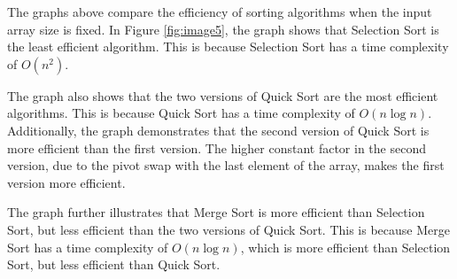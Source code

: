 \documentclass[12pt, letterpaper]{report}
\begin{document}
\clearpage

The graphs above compare the efficiency of sorting algorithms when the input array size is fixed. In Figure \ref{fig:image5}, the graph shows that Selection Sort is the least efficient algorithm. This is because Selection Sort has a time complexity of $O(n^2)$.

\par\medskip 

The graph also shows that the two versions of Quick Sort are the most efficient algorithms. This is because Quick Sort has a time complexity of $O(n \log n)$. Additionally, the graph demonstrates that the second version of Quick Sort is more efficient than the first version. The higher constant factor in the second version, due to the pivot swap with the last element of the array, makes the first version more efficient. 

\par\medskip

The graph further illustrates that Merge Sort is more efficient than Selection Sort, but less efficient than the two versions of Quick Sort. This is because Merge Sort has a time complexity of $O(n \log n)$, which is more efficient than Selection Sort, but less efficient than Quick Sort.
\end{document}
